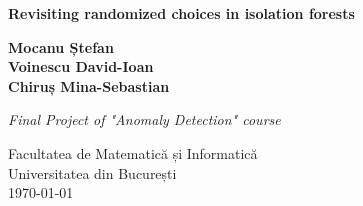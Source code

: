 \begin{titlepage}
    \centering
    \vspace*{1cm}
    
    \Huge
    \textbf{Revisiting randomized choices in isolation forests}
    
    \vspace{0.5cm}
    
    \vspace{1.5cm}
    
    \textbf{Mocanu Ștefan\\
    Voinescu David-Ioan\\
    Chiruș Mina-Sebastian}
    
    \vfill
    
    \textit{Final Project of "Anomaly Detection" course}
    
    \vspace{0.8cm}
    
    
    \Large
    Facultatea de Matematică și Informatică\\
    Universitatea din București\\
    \today
    
\end{titlepage}